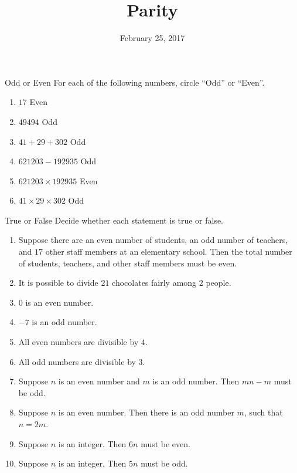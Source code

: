 \documentclass[12pt,letterpaper]{article}
\title{Parity}
\date{February 25, 2017}
\begin{document}
\maketitle

\thispagestyle{empty}

\begin{problem}{Odd or Even}
For each of the following numbers, circle ``Odd'' or ``Even''.
\begin{enumerate}
 \item $17$ \hfill {} \hspace{1em} Even
 \item $49494$ \hfill Odd \hspace{1em} 
 \item $41 + 29 + 302$ \hfill Odd \hspace{1em} 
 \item $621203 - 192935$ \hfill Odd \hspace{1em} 
 \item $621203 \times 192935$ \hfill {} \hspace{1em} Even
 \item $41 \times 29 \times 302$ \hfill Odd \hspace{1em} 
\end{enumerate}
\end{problem}

\begin{problem}{True or False}
  Decide whether each statement is true or false.

  \begin{enumerate}
    \item Suppose there are an even number of students, an odd number of
    teachers, and $17$ other staff members at an elementary school. Then the
    total number of students, teachers, and other staff members must be even.
    \hfill \TFTrue
    \item It is possible to divide \(21\) chocolates fairly among \(2\) people.
    \hfill \TFFalse
    \item \(0\) is an even number. \hfill \TFTrue
    \item \(-7\) is an odd number. \hfill \TFTrue
    \item All even numbers are divisible by \(4\). \hfill \TFFalse
    \item All odd numbers are divisible by \(3\). \hfill \TFFalse
    \item Suppose \(n\) is an even number and \(m\) is an odd number. Then \(mn -
    m\) must be odd. \hfill \TFTrue
    \item Suppose \(n\) is an even number. Then there is an odd number \(m\),
    such that \(n = 2m\). \hfill \TFFalse
    \item Suppose \(n\) is an integer. Then \(6n\) must be even. \hfill \TFTrue
    \item Suppose \(n\) is an integer. Then \(5n\) must be odd. \hfill \TFFalse
  \end{enumerate}
\end{problem}
\end{document}
